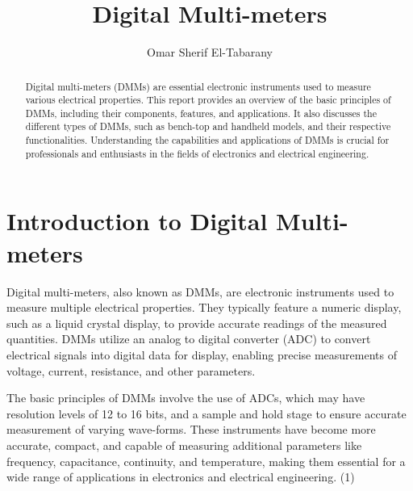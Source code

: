 \documentclass[12pt]{article}
\title{Digital Multi-meters}
\author{Omar Sherif El-Tabarany}
\date{}
\begin{document}
	
	\maketitle
	
	\begin{abstract}
		Digital multi-meters (DMMs) are essential electronic instruments used to measure various electrical properties. This report provides an overview of the basic principles of DMMs, including their components, features, and applications. It also discusses the different types of DMMs, such as bench-top and handheld models, and their respective functionalities. Understanding the capabilities and applications of DMMs is crucial for professionals and enthusiasts in the fields of electronics and electrical engineering.
	\end{abstract}
	
	\tableofcontents
	
	\section{Introduction to Digital Multi-meters}
	Digital multi-meters, also known as DMMs, are electronic instruments used to measure multiple electrical properties. They typically feature a numeric display, such as a liquid crystal display, to provide accurate readings of the measured quantities. DMMs utilize an analog to digital converter (ADC) to convert electrical signals into digital data for display, enabling precise measurements of voltage, current, resistance, and other parameters.
	
	The basic principles of DMMs involve the use of ADCs, which may have resolution levels of 12 to 16 bits, and a sample and hold stage to ensure accurate measurement of varying wave-forms. These instruments have become more accurate, compact, and capable of measuring additional parameters like frequency, capacitance, continuity, and temperature, making them essential for a wide range of applications in electronics and electrical engineering. (1)
	
\end{document}
